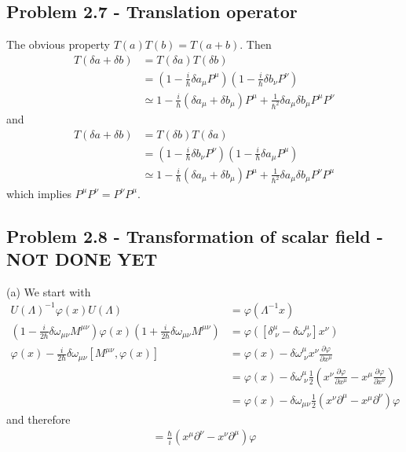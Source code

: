 \documentclass[../main.tex]{subfiles}
\begin{document}
\subsection{Problem 2.7 - Translation operator}
The obvious property $T(a)T(b)=T(a+b)$. Then
\begin{align}
T(\delta a+\delta b)&=T(\delta a)T(\delta b)\\
&=\left(1-\frac{i}{\hbar}\delta a_\mu P^\mu\right)\left(1-\frac{i}{\hbar}\delta b_\nu P^\nu\right)\\
&\simeq 1-\frac{i}{\hbar}(\delta a_\mu +\delta b_\mu) P^\mu+\frac{1}{\hbar^2}\delta a_\mu\delta b_\mu P^\mu P^\nu
\end{align}
and 
\begin{align}
T(\delta a+\delta b)&=T(\delta b)T(\delta a)\\
&=\left(1-\frac{i}{\hbar}\delta b_\nu P^\nu\right)\left(1-\frac{i}{\hbar}\delta a_\mu P^\mu\right)\\
&\simeq 1-\frac{i}{\hbar}(\delta a_\mu +\delta b_\mu) P^\mu+\frac{1}{\hbar^2}\delta a_\mu\delta b_\mu P^\nu P^\mu
\end{align}
which implies $P^\mu P^\nu=P^\nu P^\mu$.

\subsection{Problem 2.8 - Transformation of scalar field - NOT DONE YET}
(a) We start with
\begin{align}
U(\Lambda)^{-1}\varphi(x)U(\Lambda)&=\varphi(\Lambda^{-1}x)\\
\left(1-\frac{i}{2\hbar}\delta\omega_{\mu\nu}M^{\mu\nu}\right)\varphi(x)\left(1+\frac{i}{2\hbar}\delta\omega_{\mu\nu}M^{\mu\nu}\right)&=\varphi([\delta^\mu_{\;\nu}-\delta\omega^\mu_{\;\nu}]x^\nu)\\
\varphi(x)-\frac{i}{2\hbar}\delta\omega_{\mu\nu}[M^{\mu\nu},\varphi(x)]&=\varphi(x)-\delta\omega^\mu_{\;\nu}x^\nu\frac{\partial\varphi}{\partial x^\mu}\\
&=\varphi(x)-\delta\omega^\mu_{\;\nu}\frac{1}{2}\left(x^\nu\frac{\partial\varphi}{\partial x^\mu}-x^\mu\frac{\partial\varphi}{\partial x^\nu}\right)\\
&=\varphi(x)-\delta\omega_{\mu\nu}\frac{1}{2}\left(x^\nu\partial^\mu-x^\mu\partial^\nu\right)\varphi
\end{align}
and therefore
\begin{align}
[\varphi,M^{\mu\nu}]=\frac{\hbar}{i}(x^\mu\partial^\nu-x^\nu\partial^\mu)\varphi
\end{align}
\end{document}

